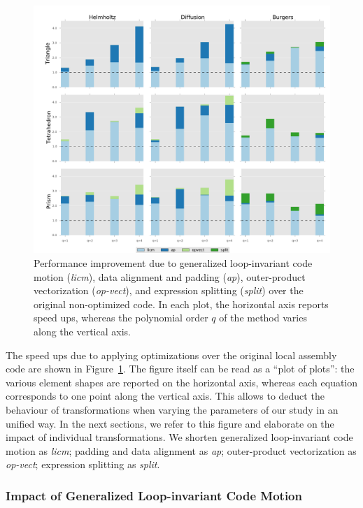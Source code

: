 \begin{figure}
\begin{center}
\centerline{\includegraphics[scale=0.55]{coffee/perf-results/individual/graph}}
\caption{Performance improvement due to generalized loop-invariant code motion (\emph{licm}), data alignment and padding (\emph{ap}), outer-product vectorization (\emph{op-vect}), and expression splitting (\emph{split}) over the original non-optimized code. In each plot, the horizontal axis reports speed ups, whereas the polynomial order $q$ of the method varies along the vertical axis.}
\label{fig:coffee-individual-res}
\end{center}
\end{figure}

The speed ups due to applying optimizations over the original local assembly code are shown in Figure~\ref{fig:coffee-individual-res}. The figure itself can be read as a ``plot of plots'': the various element shapes are reported on the horizontal axis, whereas each equation corresponds to one point along the vertical axis. This allows to deduct the behaviour of transformations when varying the parameters of our study in an unified way. In the next sections, we refer to this figure and elaborate on the impact of individual transformations. We shorten generalized loop-invariant code motion as \emph{licm}; padding and data alignment as \emph{ap}; outer-product vectorization as \emph{op-vect}; expression splitting as \emph{split}.

\subsubsection{Impact of Generalized Loop-invariant Code Motion}
\label{sec:perf-eval-licm}

